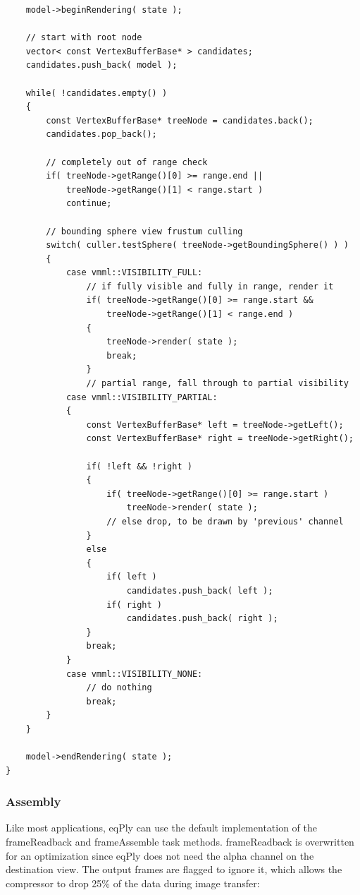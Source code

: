 \documentclass[10pt,a4]{scrartcl}
\begin{document}
{\footnotesize\begin{lstlisting}
    model->beginRendering( state );
        
    // start with root node
    vector< const VertexBufferBase* > candidates;
    candidates.push_back( model );
        
    while( !candidates.empty() )
    {
        const VertexBufferBase* treeNode = candidates.back();
        candidates.pop_back();
            
        // completely out of range check
        if( treeNode->getRange()[0] >= range.end || 
            treeNode->getRange()[1] < range.start )
            continue;
            
        // bounding sphere view frustum culling
        switch( culler.testSphere( treeNode->getBoundingSphere() ) )
        {
            case vmml::VISIBILITY_FULL:
                // if fully visible and fully in range, render it
                if( treeNode->getRange()[0] >= range.start && 
                    treeNode->getRange()[1] < range.end )
                {
                    treeNode->render( state );
                    break;
                }
                // partial range, fall through to partial visibility
            case vmml::VISIBILITY_PARTIAL:
            {
                const VertexBufferBase* left = treeNode->getLeft();
                const VertexBufferBase* right = treeNode->getRight();
            
                if( !left && !right )
                {
                    if( treeNode->getRange()[0] >= range.start )
                        treeNode->render( state );
                    // else drop, to be drawn by 'previous' channel
                }
                else
                {
                    if( left )
                        candidates.push_back( left );
                    if( right )
                        candidates.push_back( right );
                }
                break;
            }
            case vmml::VISIBILITY_NONE:
                // do nothing
                break;
        }
    }
        
    model->endRendering( state );
}
\end{lstlisting}}

\subsubsection{Assembly}

Like most applications, eqPly can use the default implementation of the
\textsf{frameReadback} and \textsf{frameAssemble} task methods.
\textsf{frameReadback} is overwritten for an optimization since eqPly
does not need the alpha channel on the destination view.
The output frames are flagged to ignore it, which allows the compressor to
drop 25\% of the data during image transfer:
\end{document}
